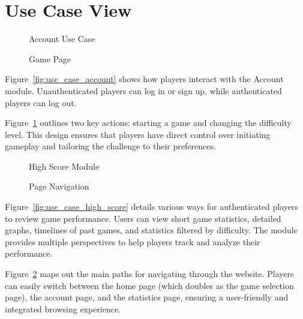 \documentclass[11pt,a4paper]{article}
\newcommand{\inputdiagram}[1]{}
\newcommand{\textwidthdiagram}[2][1]{%
  \resizebox{#1\textwidth}{!}{\inputdiagram{#2}}%
}
\begin{document}
\section{Use Case View}

\begin{figure}[H]
    \centering
    \begin{minipage}[b]{0.48\textwidth}
        \centering
        \textwidthdiagram{use_case_account.tex}
        \caption{Account Use Case}
        \label{fig:use_case_account}
    \end{minipage}
    \hfil
    \begin{minipage}[b]{0.48\textwidth}
        \centering
        \textwidthdiagram{use_case_game_page.tex}
        \caption{Game Page}
        \label{fig:use_case_game_page}
    \end{minipage}
\end{figure}

Figure~\ref{fig:use_case_account} shows how players interact with the Account module.
Unauthenticated players can log in or sign up, while authenticated players can log out.

Figure~\ref{fig:use_case_game_page} outlines two key actions: starting a game and
changing the difficulty level. This design ensures that players have direct
control over initiating gameplay and tailoring the challenge to their
preferences.

\begin{figure}[H]
    \centering
    \begin{minipage}[b]{0.48\textwidth}
        \textwidthdiagram{use_case_high_score.tex}
        \caption{High Score Module}
        \label{fig:use_case_high_score}
    \end{minipage}
    \hfil
    \begin{minipage}[b]{0.48\textwidth}
        \centering
        \textwidthdiagram{use_case_navigation.tex}
        \caption{Page Navigation}
        \label{fig:use_case_navigation}
    \end{minipage}
\end{figure}

Figure~\ref{fig:use_case_high_score} details various ways for authenticated players to review game performance. Users
can view short game statistics, detailed graphs, timelines of past games, and
statistics filtered by difficulty. The module provides multiple perspectives to
help players track and analyze their performance.

Figure~\ref{fig:use_case_navigation} maps out the main paths for navigating through the website.
Players can easily switch between the home page (which doubles as the game
selection page), the account page, and the statistics page, ensuring a
user-friendly and integrated browsing experience.
\end{document}
